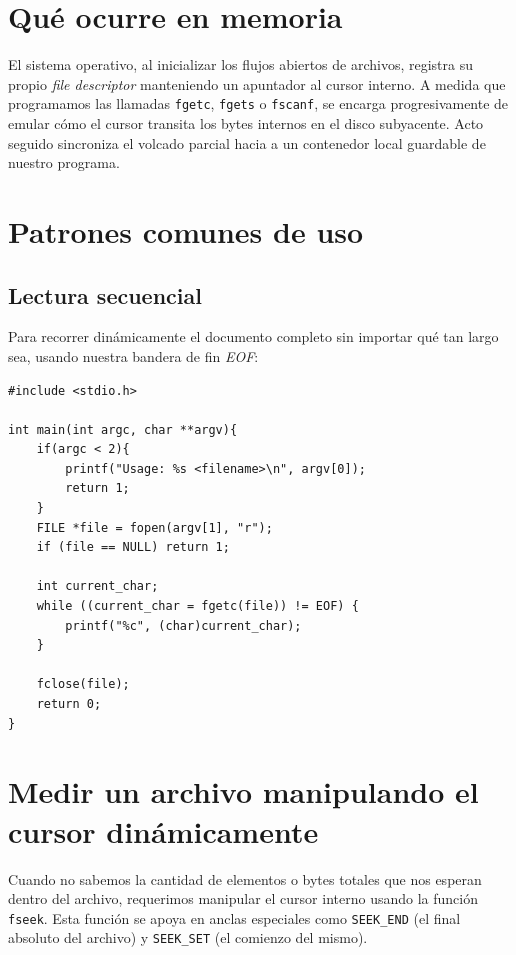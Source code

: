 \documentclass[12pt,a4paper]{article}
\begin{document}
\newpage

\section{Qué ocurre en memoria}
El sistema operativo, al inicializar los flujos abiertos de archivos, registra su propio \textit{file descriptor} manteniendo un apuntador al cursor interno. A medida que programamos las llamadas \texttt{fgetc}, \texttt{fgets} o \texttt{fscanf}, se encarga progresivamente de emular cómo el cursor transita los bytes internos en el disco subyacente. Acto seguido sincroniza el volcado parcial hacia a un contenedor local guardable de nuestro programa.

\section{Patrones comunes de uso}
\subsection{Lectura secuencial}
Para recorrer dinámicamente el documento completo sin importar qué tan largo sea, usando nuestra bandera de fin \textit{EOF}:
\begin{lstlisting}
#include <stdio.h>

int main(int argc, char **argv){
    if(argc < 2){
        printf("Usage: %s <filename>\n", argv[0]);
        return 1;
    }
    FILE *file = fopen(argv[1], "r");
    if (file == NULL) return 1;

    int current_char;
    while ((current_char = fgetc(file)) != EOF) {
        printf("%c", (char)current_char);
    }

    fclose(file);
    return 0;
}
\end{lstlisting}

\newpage

\section{Medir un archivo manipulando el cursor dinámicamente}
Cuando no sabemos la cantidad de elementos o bytes totales que nos esperan dentro del archivo, requerimos manipular el cursor interno usando la función \texttt{fseek}. Esta función se apoya en anclas especiales como \texttt{SEEK\_END} (el final absoluto del archivo) y \texttt{SEEK\_SET} (el comienzo del mismo).
\end{document}
